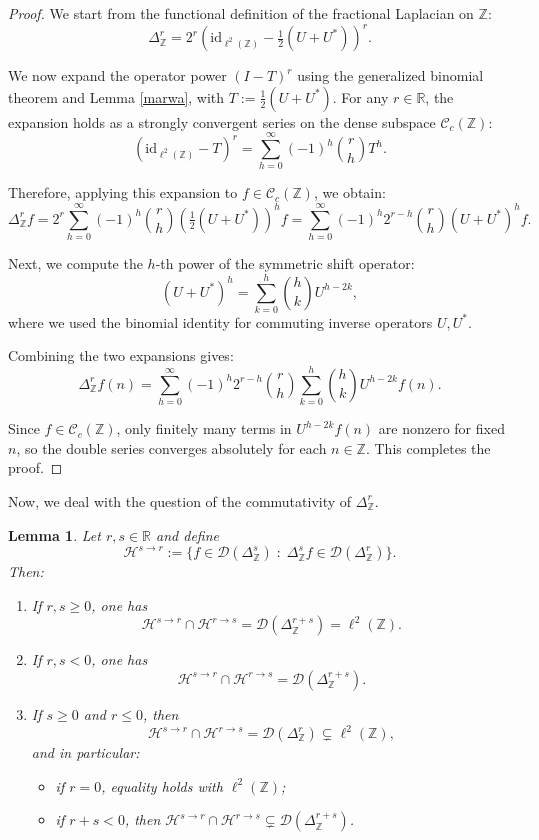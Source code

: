 \documentclass[10pt]{amsart} %
\newcommand{\Z}{{\mathbb{Z}}}
\newcommand{\1}{{\mathbb{I}}}
\numberwithin{equation}{section}
\newtheorem{lemma}[theorem]{Lemma}%
\begin{document}
\begin{proof}
We start from the functional definition of the fractional Laplacian on \( \mathbb{Z} \):
\[
\Delta^r_{\mathbb{Z}} = 2^r \left( \mathrm{id}_{\ell^2(\Z)} - \tfrac{1}{2}(U + U^*) \right)^r.
\]

We now expand the operator power \( (I - T)^r \) using the generalized binomial theorem and Lemma \ref{marwa}, with \( T := \tfrac{1}{2}(U + U^*) \). For any \( r \in \mathbb{R} \), the expansion holds as a strongly convergent series on the dense subspace \( \mathcal{C}_c(\mathbb{Z}) \):
\[
(\mathrm{id}_{\ell^2(\Z)} - T)^r = \sum_{h=0}^\infty (-1)^h \binom{r}{h} T^h.
\]

Therefore, applying this expansion to \( f \in \mathcal{C}_c(\mathbb{Z}) \), we obtain:
\[
\Delta^r_{\mathbb{Z}} f
= 2^r \sum_{h=0}^\infty (-1)^h \binom{r}{h} \left( \tfrac{1}{2}(U + U^*) \right)^h f
= \sum_{h=0}^\infty (-1)^h 2^{r - h} \binom{r}{h} (U + U^*)^h f.
\]

Next, we compute the \( h \)-th power of the symmetric shift operator:
\[
(U + U^*)^h = \sum_{k=0}^h \binom{h}{k} U^{h - 2k},
\]
where we used the binomial identity for commuting  inverse operators \( U, U^* \).

Combining the two expansions gives:
\[
\Delta^r_{\mathbb{Z}} f(n)
= \sum_{h=0}^\infty (-1)^h 2^{r - h} \binom{r}{h} \sum_{k=0}^h \binom{h}{k} U^{h - 2k} f(n).
\]

Since \( f \in \mathcal{C}_c(\mathbb{Z}) \), only finitely many terms in \( U^{h - 2k} f(n) \) are nonzero for fixed \( n \), so the double series converges absolutely for each \( n \in \mathbb{Z} \). This completes the proof.
\end{proof}
Now, we deal with the question of the commutativity of $\Delta_{\Z}^r$.
\begin{lemma}\label{sb-space}
Let $r,s \in \mathbb{R}$ and define
\[
\mathcal{H}^{s \to r} := \{ f \in \mathcal{D}(\Delta_{\mathbb{Z}}^{s}) \;:\; \Delta_{\mathbb{Z}}^{s} f \in \mathcal{D}(\Delta_{\mathbb{Z}}^{r}) \}.
\]
Then:
\begin{enumerate}
\item If $r, s \ge 0$, one has
\[
\mathcal{H}^{s \to r} \cap \mathcal{H}^{r \to s} = \mathcal{D}(\Delta_{\mathbb{Z}}^{r+s}) = \ell^2(\mathbb{Z}).
\]
\item If $r, s < 0$, one has
\[
\mathcal{H}^{s \to r} \cap \mathcal{H}^{r \to s} = \mathcal{D}(\Delta_{\mathbb{Z}}^{r+s}).
\]
\item If $s \ge 0$ and $r \le 0$, then
\[
\mathcal{H}^{s \to r} \cap \mathcal{H}^{r \to s} = \mathcal{D}(\Delta_{\mathbb{Z}}^{r}) \subsetneq \ell^2(\mathbb{Z}),
\]
and in particular:
\begin{itemize}
\item if $r = 0$, equality holds with $\ell^2(\mathbb{Z})$;
\item if $r+s < 0$, then $\mathcal{H}^{s \to r} \cap \mathcal{H}^{r \to s} \subsetneq \mathcal{D}(\Delta_{\mathbb{Z}}^{r+s})$.
\end{itemize}
\end{enumerate}
\end{lemma}
\end{document}
